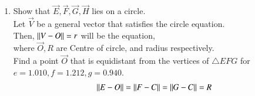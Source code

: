 
\renewcommand{\theequation}{\theenumi}
\begin{enumerate}[label=\thesection.\arabic*.,ref=\thesection.\theenumi]
	
\item Show that $\vec{E},\vec{F},\vec{G},\vec{H}$ lies on a circle.
\\
\solution Let $\vec{V}$ be a general vector that satisfies the circle equation.
\\
Then, $\left\lVert V-O\right\rVert=r$ will be the equation,
\\
where $\vec{O},R$ are Centre of circle, and radius respectively.
\\
Find a point $\vec{O}$ that is equidistant from the vertices of $\triangle EFG$ for $e = 1.010, f = 1.212, g = 0.940$.
\begin{align}
\label{eq:ec}
\left\lVert E-O\right\rVert=
\left\lVert F-C\right\rVert=
\left\lVert G-C\right\rVert=R
\end{align}

\end{enumerate}
